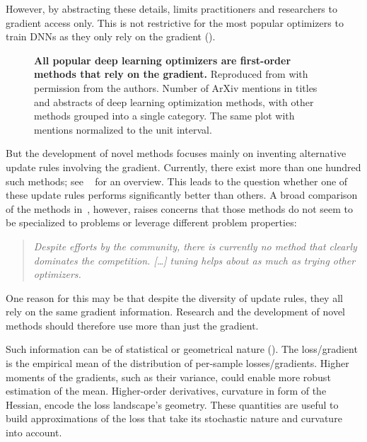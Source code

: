 However, by abstracting these details, 
limits practitioners and researchers to gradient access only. This is not
restrictive for the most popular optimizers to train DNNs as they only rely on
the gradient ().
%
\begin{figure}[!t]
  \centering
  \tikzexternalenable%
  
  \tikzexternaldisable%
  \vspace{-3ex}
  \caption{\textbf{All popular deep learning optimizers are first-order methods
      that rely on the gradient.} Reproduced from \citet{schmidt2021descending}
    with permission from the authors.
     Number of ArXiv mentions in
    titles and abstracts of deep learning optimization methods, with other
    methods grouped into a single category.
     The same plot with mentions
    normalized to the unit interval.}\label{fig:background::ArxivMentions}
\end{figure}
%
But the development of novel methods focuses mainly on inventing alternative
update rules involving the gradient. Currently, there exist more than one
hundred such methods; see \eg~\cite{schmidt2021descending} for an overview. This
leads to the question whether one of these update rules performs significantly
better than others. A broad comparison of the methods
in~, however, raises concerns that those
methods do not seem to be specialized to problems or leverage different problem
properties:
\begin{quotation}
  \itshape%
  Despite efforts by the community, there is currently no method that clearly
  dominates the competition. [\dots] tuning helps about as much as trying other
  optimizers. \hfill \citet{schmidt2021descending}
\end{quotation}
One reason for this may be that despite the diversity of update rules, they
all rely on the same gradient information. Research and the development of novel
methods should therefore use more than just the gradient.

Such information can be of statistical or geometrical nature
(). The loss/gradient is the
empirical mean of the distribution of per-sample losses/gradients. Higher
moments of the gradients, such as their variance, could enable more robust
estimation of the mean. Higher-order derivatives, \eg curvature in form of the
Hessian, encode the loss landscape’s geometry. These quantities are useful to
build approximations of the loss that take its stochastic nature and curvature
into account.

